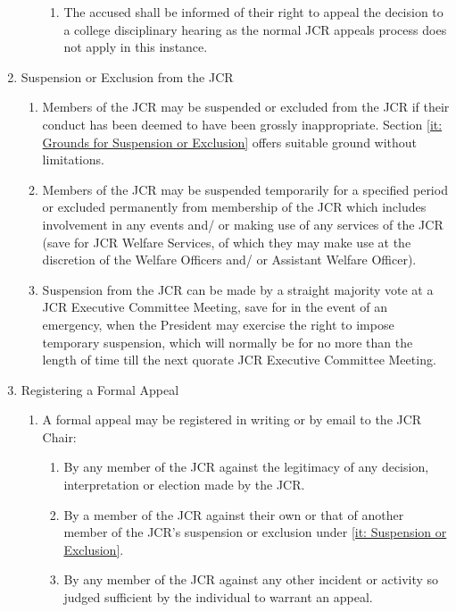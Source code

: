 \begin{enumerate}
\begin{enumerate}
\begin{enumerate}
            \item The accused shall be informed of their right to appeal the decision to a college disciplinary hearing as the normal JCR appeals process does not apply in this instance.
        \end{enumerate}
    \end{enumerate}
    \item Suspension or Exclusion from the JCR
    \label{it: Suspension or Exclusion}
    \begin{enumerate}
        \item Members of the JCR may be suspended or excluded from the JCR if their conduct has been deemed to have been grossly inappropriate. Section \ref{it: Grounds for Suspension or Exclusion} offers suitable ground without limitations.
        \item Members of the JCR may be suspended temporarily for a specified period or excluded permanently from membership of the JCR which includes involvement in any events and/ or making use of any services of the JCR (save for JCR Welfare Services, of which they may make use at the discretion of the Welfare Officers and/ or Assistant Welfare Officer).
        \item Suspension from the JCR can be made by a straight majority vote at a JCR Executive Committee Meeting, save for in the event of an emergency, when the President may exercise the right to impose temporary suspension, which will normally be for no more than the length of time till the next quorate JCR Executive Committee Meeting.
    \end{enumerate}
    \item Registering a Formal Appeal
    \begin{enumerate}
        \item A formal appeal may be registered in writing or by email to the JCR Chair:
        \begin{enumerate}
            \item By any member of the JCR against the legitimacy of any decision, interpretation or
            election made by the JCR.
            \item By a member of the JCR against their own or that of another member of the JCR’s suspension or exclusion under \ref{it: Suspension or Exclusion}.
            \item By any member of the JCR against any other incident or activity so judged sufficient by the individual to warrant an appeal.
        \end{enumerate}

\end{enumerate}
\end{enumerate}
